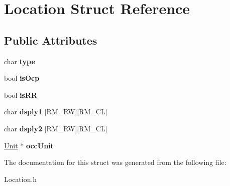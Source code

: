 \hypertarget{struct_location}{}\section{Location Struct Reference}
\label{struct_location}
\subsection*{Public Attributes}
\begin{DoxyCompactItemize}
\item 
\mbox{\label{struct_location_a7aec2c5b288314de68044c87491c92db}} 
char {\bfseries type}
\item 
\mbox{\label{struct_location_a154d2e4bad85a96516ee30db2ad34539}} 
bool {\bfseries is\+Ocp}
\item 
\mbox{\label{struct_location_a58d18dc6ccc52d2ddc89c86a65147720}} 
bool {\bfseries is\+RR}
\item 
\mbox{\label{struct_location_a8a17085feb5ce20b4c688e53b5a40350}} 
char {\bfseries dsply1} \mbox{[}R\+M\+\_\+\+RW\mbox{]}\mbox{[}R\+M\+\_\+\+CL\mbox{]}
\item 
\mbox{\label{struct_location_ae855f28a3079186472afa9a485865383}} 
char {\bfseries dsply2} \mbox{[}R\+M\+\_\+\+RW\mbox{]}\mbox{[}R\+M\+\_\+\+CL\mbox{]}
\item 
\mbox{\label{struct_location_a1c77a882502c2e74a659e35195486da9}} 
\mbox{\hyperlink{struct_unit}{Unit}} $\ast$ {\bfseries occ\+Unit}
\end{DoxyCompactItemize}


The documentation for this struct was generated from the following file\+:\begin{DoxyCompactItemize}
\item 
Location.\+h\end{DoxyCompactItemize}

